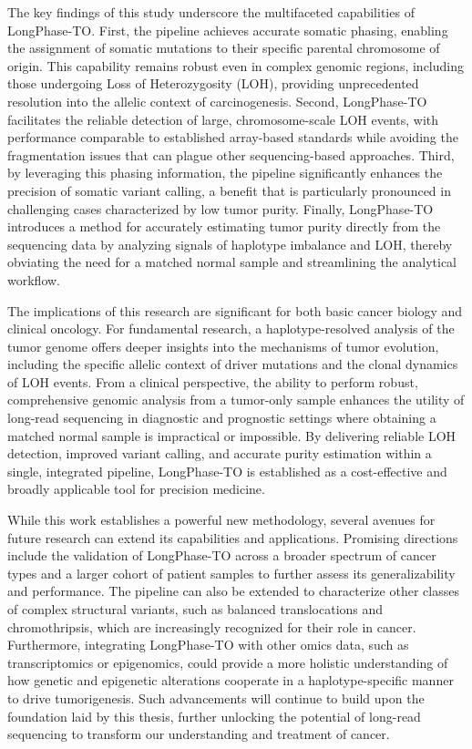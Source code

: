 \documentclass[pdflatex,sn-nature]{sn-jnl}
\begin{document}
The key findings of this study underscore the multifaceted capabilities of LongPhase-TO. First, the pipeline achieves accurate somatic phasing, enabling the assignment of somatic mutations to their specific parental chromosome of origin. This capability remains robust even in complex genomic regions, including those undergoing Loss of Heterozygosity (LOH), providing unprecedented resolution into the allelic context of carcinogenesis. Second, LongPhase-TO facilitates the reliable detection of large, chromosome-scale LOH events, with performance comparable to established array-based standards while avoiding the fragmentation issues that can plague other sequencing-based approaches. Third, by leveraging this phasing information, the pipeline significantly enhances the precision of somatic variant calling, a benefit that is particularly pronounced in challenging cases characterized by low tumor purity. Finally, LongPhase-TO introduces a method for accurately estimating tumor purity directly from the sequencing data by analyzing signals of haplotype imbalance and LOH, thereby obviating the need for a matched normal sample and streamlining the analytical workflow.

The implications of this research are significant for both basic cancer biology and clinical oncology. For fundamental research, a haplotype-resolved analysis of the tumor genome offers deeper insights into the mechanisms of tumor evolution, including the specific allelic context of driver mutations and the clonal dynamics of LOH events. From a clinical perspective, the ability to perform robust, comprehensive genomic analysis from a tumor-only sample enhances the utility of long-read sequencing in diagnostic and prognostic settings where obtaining a matched normal sample is impractical or impossible. By delivering reliable LOH detection, improved variant calling, and accurate purity estimation within a single, integrated pipeline, LongPhase-TO is established as a cost-effective and broadly applicable tool for precision medicine.

While this work establishes a powerful new methodology, several avenues for future research can extend its capabilities and applications. Promising directions include the validation of LongPhase-TO across a broader spectrum of cancer types and a larger cohort of patient samples to further assess its generalizability and performance. The pipeline can also be extended to characterize other classes of complex structural variants, such as balanced translocations and chromothripsis, which are increasingly recognized for their role in cancer. Furthermore, integrating LongPhase-TO with other omics data, such as transcriptomics or epigenomics, could provide a more holistic understanding of how genetic and epigenetic alterations cooperate in a haplotype-specific manner to drive tumorigenesis. Such advancements will continue to build upon the foundation laid by this thesis, further unlocking the potential of long-read sequencing to transform our understanding and treatment of cancer.
\end{document}
